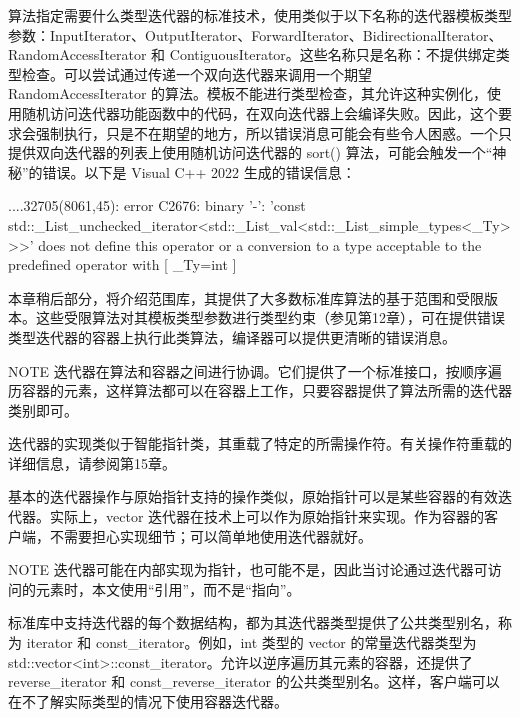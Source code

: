 算法指定需要什么类型迭代器的标准技术，使用类似于以下名称的迭代器模板类型参数：InputIterator、OutputIterator、ForwardIterator、BidirectionalIterator、RandomAccessIterator 和 ContiguousIterator。这些名称只是名称：不提供绑定类型检查。可以尝试通过传递一个双向迭代器来调用一个期望 RandomAccessIterator 的算法。模板不能进行类型检查，其允许这种实例化，使用随机访问迭代器功能函数中的代码，在双向迭代器上会编译失败。因此，这个要求会强制执行，只是不在期望的地方，所以错误消息可能会有些令人困惑。一个只提供双向迭代器的列表上使用随机访问迭代器的 sort() 算法，可能会触发一个“神秘”的错误。以下是 Visual C++ 2022 生成的错误信息：

\begin{shell}
...\MSVC{}.32705\algorithm(8061,45): error C2676: binary '-': 'const
std::_List_unchecked_iterator<std::_List_val<std::_List_simple_types<_Ty>>>' does
not define this operator or a conversion to a type acceptable to the
predefined operator
    with
    [
      _Ty=int
    ]
\end{shell}

本章稍后部分，将介绍范围库，其提供了大多数标准库算法的基于范围和受限版本。这些受限算法对其模板类型参数进行类型约束（参见第12章），可在提供错误类型迭代器的容器上执行此类算法，编译器可以提供更清晰的错误消息。

\begin{myNotic}{NOTE}
迭代器在算法和容器之间进行协调。它们提供了一个标准接口，按顺序遍历容器的元素，这样算法都可以在容器上工作，只要容器提供了算法所需的迭代器类别即可。
\end{myNotic}

迭代器的实现类似于智能指针类，其重载了特定的所需操作符。有关操作符重载的详细信息，请参阅第15章。

基本的迭代器操作与原始指针支持的操作类似，原始指针可以是某些容器的有效迭代器。实际上，vector 迭代器在技术上可以作为原始指针来实现。作为容器的客户端，不需要担心实现细节；可以简单地使用迭代器就好。

\begin{myNotic}{NOTE}
迭代器可能在内部实现为指针，也可能不是，因此当讨论通过迭代器可访问的元素时，本文使用“引用”，而不是“指向”。
\end{myNotic}


标准库中支持迭代器的每个数据结构，都为其迭代器类型提供了公共类型别名，称为 iterator 和 const\_iterator。例如，int 类型的 vector 的常量迭代器类型为 std::vector<int>::const\_iterator。允许以逆序遍历其元素的容器，还提供了 reverse\_iterator 和 const\_reverse\_iterator 的公共类型别名。这样，客户端可以在不了解实际类型的情况下使用容器迭代器。

